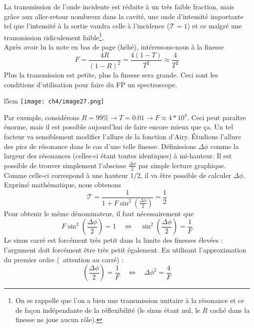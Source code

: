 La transmission de l'onde incidente est réduite à un très faible fraction, mais grâce aux aller-retour
nombreux dans la cavité, une onde d'intensité importante tel que l'intensité à la sortie vaudra 
celle à l'incidence ($\mathcal{T}=1$) et ce malgré une transmission ridiculement faible\footnote{On 
se rappelle que l'on a bien une transmission unitaire à la résonance et ce de façon indépendante de la 
réflexibilité (le sinus étant nul, le $R$ caché dans la finesse ne joue aucun rôle).}. \\

Après avoir lu la note en bas de page (héhé), intéressons-nous à la finesse
\begin{equation}
F = \frac{4R}{(1-R)^2}=\dfrac{4(1-T)}{T^2} \approx \frac{4}{T^2}
\end{equation}
Plus la transmission est petite, plus la finesse sera grande. Ceci sont les conditions d'utilisation 
pour faire du FP un spectroscope.\\

	\begin{wrapfigure}[8]{l}{5cm}
	\vspace{-8mm}
	\texttt{[image: ch4/image27.png]}
	\end{wrapfigure}
Par exemple, considérons $R=99\%\rightarrow T=0.01\rightarrow F\approx 4*10^4$. Ceci peut paraître 
énorme, mais il est possible aujourd'hui de faire encore mieux que ça. Un tel facteur va sensiblement 
modifier l'allure de la fonction d'Airy. Étudions l'allure des pics de résonance dans le cas d'une 
telle finesse. Définissions $\Delta\phi$ comme la largeur des résonances (celles-ci étant toutes 
identiques) à mi-hauteur. Il est possible de trouver simplement l'abscisse $\frac{\Delta \phi}{2}$ 
par simple lecture graphique. Comme celle-ci correspond à une hauteur 1/2, il va être possible de 
calculer $\Delta\phi$. Exprimé mathématique, nous obtenons
\begin{equation}
\mathcal{T} = \dfrac{1}{1+F\sin^2\left(\frac{\Delta\phi}{2}\right)}= \frac{1}{2}
\end{equation}
Pour obtenir le même dénominateur, il faut nécessairement que 
\begin{equation}
F\sin^2\left(\frac{\Delta\phi}{2}\right)=1\quad\Leftrightarrow\quad \sin^2\left(\frac{\Delta\phi}{2}\right)
=\dfrac{1}{F}
\end{equation}
Le sinus carré est forcément très petit dans la limite des finesses élevées : l'argument doit forcément 
être très petit également. En utilisant l'approximation du premier ordre (\danger\ attention au carré) :
\begin{equation}
\left(\frac{\Delta\phi}{2}\right) = \frac{1}{F}\quad\Leftrightarrow\quad \Delta\phi^2 = \frac{4}{F}
\end{equation}

